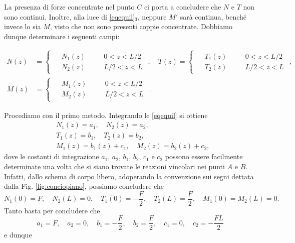La presenza di forze concentrate nel punto $C$ ci porta a concludere che $N$ e $T$ non sono continui. Inoltre, alla luce di \eqref{eqequil}$_3$, neppure $M'$ sarà continua, benché invece lo sia $M$, visto che non sono presenti coppie concentrate. Dobbiamo dunque determinare i seguenti campi:



\begin{equation}
	\begin{aligned}
		N(z) &= \begin{cases}
			\begin{aligned}
				&N_1(z) \quad &&0<z<L/2 \\
				&N_2(z) \quad &&L/2<z<L
			\end{aligned}
		\end{cases}, \quad 
		T(z) = \begin{cases}
			\begin{aligned}
				&T_1(z) \quad &&0<z<L/2 \\
				&T_2(z) \quad &&L/2<z<L
			\end{aligned}
		\end{cases}, \\
		M(z) &= \begin{cases}
			\begin{aligned}
				&M_1(z) \quad &&0<z<L/2 \\
				&M_2(z) \quad &&L/2<z<L
			\end{aligned}
		\end{cases}.
	\end{aligned}
\end{equation}

Procediamo con il primo metodo. Integrando le \eqref{eqequil} si ottiene
\begin{equation}
	\begin{aligned}
&N_1(z)=a_1, \quad N_2(z)=a_2,\\ 
&T_1(z)=b_1, \quad T_2(z)=b_2, \\ 
& M_1(z)=b_1(z)+c_1, \quad  M_2(z)=b_2(z)+c_2,
	\end{aligned}
\end{equation}
dove le costanti di integrazione $a_1$, $a_2$, $b_1$, $b_2$, $c_1$ e $c_2$ possono essere facilmente  determinate una volta che si siano trovate le reazioni vincolari nei punti $A$ e $B$. Infatti, dallo schema di corpo libero, adoperando la convenzione sui segni dettata dalla Fig. \ref{fig:conciopiano}, possiamo concludere che
\begin{equation}
	N_1(0)=F, \quad N_2(L)=0, \quad T_1(0)=-\frac F2,  \quad T_2(L)=\frac F2, \quad M_1(0)=M_2(L)=0.
\end{equation}
Tanto basta per concludere che
\begin{equation}
a_1=F, \quad a_2=0, \quad b_1=-\frac F2, \quad  b_2=\frac F2, \quad c_1=0, \quad c_2=-\frac{FL}{2}
\end{equation}
e dunque

